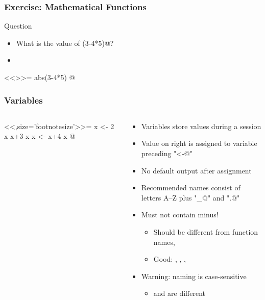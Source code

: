 \documentclass[%
  final,
  11pt, 
  show notes, %
  t, %
  fleqn, %
]{beamer}
\begin{document}
\begin{frame}[fragile]
  \frametitle{Exercise: Mathematical Functions}
\vfill
\begin{exampleblock}{Question}
\begin{itemize}
\item What is the value of \verb@abs(3-4*5)@?
\item \CourseQuiz
\end{itemize}
\end{exampleblock}
\ifQuizSolution
\pause
<<>>=
abs(3-4*5)
@
\fi
\vfill
\end{frame}

\begin{frame}[fragile]
  \frametitle{Variables}
\begin{columns}[T]
\begin{column}{.35\textwidth}
<<,size='footnotesize'>>=
x <- 2
x
x+3
x
x <- x+4
x
@
\end{column}
\begin{column}{.6\textwidth}
\begin{itemize}
\item Variables store values during a session
\item Value on right is assigned to variable preceding "\verb@<-@"
\item No default output after assignment
\item Recommended names consist of letters A--Z plus "\verb@_@" and "\verb@.@"
\item Must not contain minus!
\begin{itemize}
\item Should be different from function names, \eg \verb@sin@
\item Good: \verb@x@, \verb@fit@, \verb@ratio@, \etc
\end{itemize}
\item Warning: naming is case-sensitive 
\begin{itemize}
\item \ie \verb@x@ and \verb@X@ are different
\end{itemize}
\end{itemize}
\end{column}
\end{columns}
\end{frame}

\end{document}
